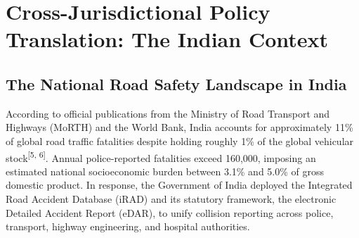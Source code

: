 \documentclass[11pt,a4paper]{article}
\begin{document}
\section{Cross-Jurisdictional Policy Translation: The Indian Context}
\subsection{The National Road Safety Landscape in India}
According to official publications from the Ministry of Road Transport and Highways (MoRTH) and the World Bank, India accounts for approximately 11\% of global road traffic fatalities despite holding roughly 1\% of the global vehicular stock\textsuperscript{[5, 6]}. Annual police-reported fatalities exceed 160,000, imposing an estimated national socioeconomic burden between 3.1\% and 5.0\% of gross domestic product. In response, the Government of India deployed the Integrated Road Accident Database (iRAD) and its statutory framework, the electronic Detailed Accident Report (eDAR), to unify collision reporting across police, transport, highway engineering, and hospital authorities.
\end{document}
